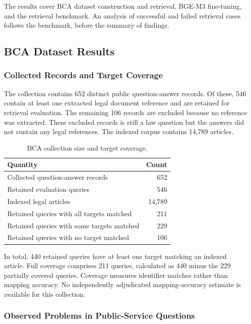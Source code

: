 The results cover BCA dataset construction and retrieval, BGE-M3 fine-tuning, and the retrieval benchmark. An analysis of successful and failed retrieval cases follows the benchmark, before the summary of findings.

\subsection{BCA Dataset Results}
\label{sec:bca-results}

\subsubsection{Collected Records and Target Coverage}

The collection contains 652 distinct public question-answer records. Of these, 546 contain at least one extracted legal document reference and are retained for retrieval evaluation. The remaining 106 records are excluded because no reference was extracted. These excluded records is still a law question but the answers did not contain any legal references. The indexed corpus contains 14,789 articles.

\begin{table}[H]
\centering
\small
\caption{BCA collection size and target coverage.}\label{tab:bca-collection}
\begin{tabular}{@{}p{11cm}r@{}}
\toprule
\textbf{Quantity} & \textbf{Count}\\
\midrule
Collected question-answer records & 652\\
Retained evaluation queries & 546\\
Indexed legal articles & 14,789\\
\midrule
Retained queries with all targets matched & 211\\
Retained queries with some targets matched & 229\\
Retained queries with no target matched & 106\\
\bottomrule
\end{tabular}
\end{table}

In total, 440 retained queries have at least one target matching an indexed article. Full coverage comprises 211 queries, calculated as 440 minus the 229 partially covered queries. Coverage measures identifier matches rather than mapping accuracy. No independently adjudicated mapping-accuracy estimate is available for this collection.

\subsubsection{Observed Problems in Public-Service Questions}

